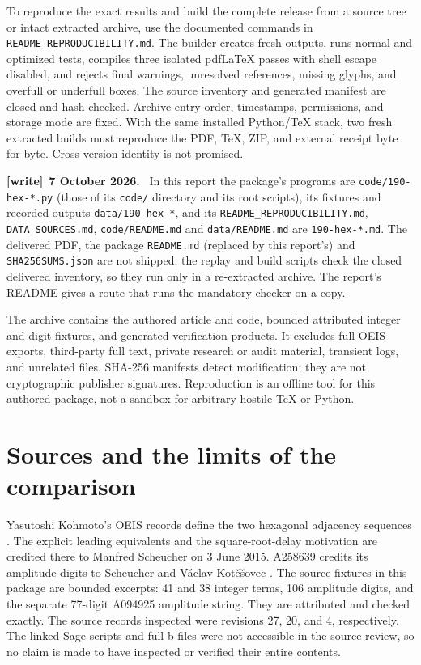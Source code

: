 \documentclass[11pt]{article}
\theoremstyle{remark}\newtheorem{remark}[theorem]{Remark}
\newcommand{\file}[1]{\nolinkurl{#1}}
\newenvironment{writenote}[1][]{\par\smallskip\begingroup\small
 \noindent\textbf{[write]}\if\relax\detokenize{#1}\relax\else~\textbf{#1.}\fi\ }%
 {\par\endgroup\smallskip}
\begin{document}
To reproduce the exact results and build the complete release from a source tree or intact extracted archive, use the documented commands in \texttt{README\_REPRODUCIBILITY.md}. The builder creates fresh outputs, runs normal and optimized tests, compiles three isolated pdfLaTeX passes with shell escape disabled, and rejects final warnings, unresolved references, missing glyphs, and overfull or underfull boxes. The source inventory and generated manifest are closed and hash-checked. Archive entry order, timestamps, permissions, and storage mode are fixed. With the same installed Python/TeX stack, two fresh extracted builds must reproduce the PDF, TeX, ZIP, and external receipt byte for byte. Cross-version identity is not promised.

\begin{writenote}[7 October 2026]
In this report the package's programs are \file{code/190-hex-*.py} (those of its \file{code/} directory and its root scripts), its fixtures and recorded outputs \file{data/190-hex-*}, and its \file{README_REPRODUCIBILITY.md}, \file{DATA_SOURCES.md}, \file{code/README.md} and \file{data/README.md} are \file{190-hex-*.md}. The delivered PDF, the package \file{README.md} (replaced by this report's) and \file{SHA256SUMS.json} are not shipped; the replay and build scripts check the closed delivered inventory, so they run only in a re-extracted archive. The report's README gives a route that runs the mandatory checker on a copy.
\end{writenote}

The archive contains the authored article and code, bounded attributed integer and digit fixtures, and generated verification products. It excludes full OEIS exports, third-party full text, private research or audit material, transient logs, and unrelated files. SHA-256 manifests detect modification; they are not cryptographic publisher signatures. Reproduction is an offline tool for this authored package, not a sandbox for arbitrary hostile TeX or Python.

\section{Sources and the limits of the comparison}\label{sfb:hex:sec:sources}
Yasutoshi Kohmoto's OEIS records define the two hexagonal adjacency sequences \cite{oeis926,oeis925}. The explicit leading equivalents and the square-root-delay motivation are credited there to Manfred Scheucher on 3 June 2015. A258639 credits its amplitude digits to Scheucher and V\'aclav Kot\v e\v sovec \cite{oeis639}. The source fixtures in this package are bounded excerpts: 41 and 38 integer terms, 106 amplitude digits, and the separate 77-digit A094925 amplitude string. They are attributed and checked exactly. The source records inspected were revisions 27, 20, and 4, respectively. The linked Sage scripts and full b-files were not accessible in the source review, so no claim is made to have inspected or verified their entire contents.
\end{document}
